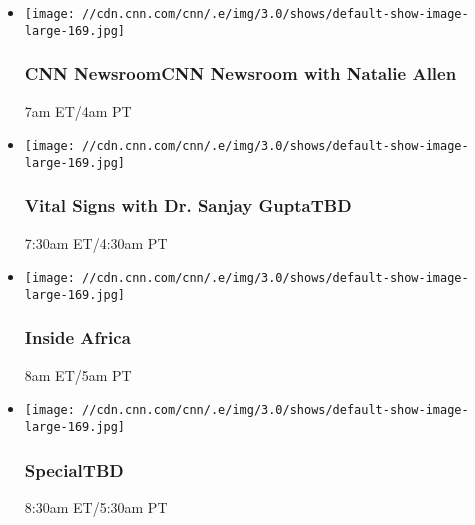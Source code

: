 \begin{itemize}
\item
  \texttt{[image: //cdn.cnn.com/cnn/.e/img/3.0/shows/default-show-image-large-169.jpg]}

  \hypertarget{cnn-newsroomcnn-newsroom-with-natalie-allen--2}{%
  \subsubsection{CNN NewsroomCNN Newsroom with Natalie Allen
  }\label{cnn-newsroomcnn-newsroom-with-natalie-allen--2}}

  7am ET/4am PT
\end{itemize}

\begin{itemize}
\item
  \texttt{[image: //cdn.cnn.com/cnn/.e/img/3.0/shows/default-show-image-large-169.jpg]}

  \hypertarget{vital-signs-with-dr-sanjay-guptatbd-}{%
  \subsubsection{Vital Signs with Dr. Sanjay GuptaTBD
  }\label{vital-signs-with-dr-sanjay-guptatbd-}}

  7:30am ET/4:30am PT
\end{itemize}

\begin{itemize}
\item
  \texttt{[image: //cdn.cnn.com/cnn/.e/img/3.0/shows/default-show-image-large-169.jpg]}

  \hypertarget{inside-africa}{%
  \subsubsection{Inside Africa}\label{inside-africa}}

  8am ET/5am PT
\end{itemize}

\begin{itemize}
\item
  \texttt{[image: //cdn.cnn.com/cnn/.e/img/3.0/shows/default-show-image-large-169.jpg]}

  \hypertarget{specialtbd-}{%
  \subsubsection{SpecialTBD }\label{specialtbd-}}

  8:30am ET/5:30am PT
\end{itemize}


